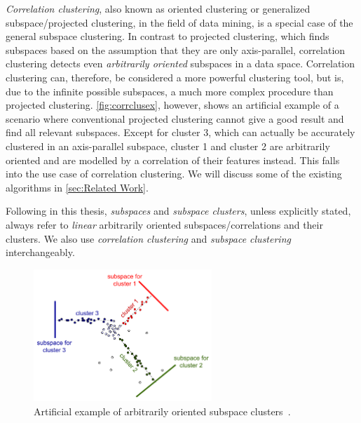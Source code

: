 \textit{Correlation clustering}, also known as oriented clustering or generalized subspace/projected clustering, in the field of data mining, is a special case of the general subspace clustering. In contrast to projected clustering, which finds subspaces based on the assumption that they are only axis-parallel, correlation clustering detects even \textit{arbitrarily oriented} subspaces in a data space. Correlation clustering can, therefore, be considered a more powerful clustering tool, but is, due to the infinite possible subspaces, a much more complex procedure than projected clustering. \autoref{fig:corrclusex}, however, shows an artificial example of a scenario where conventional projected clustering cannot give a good result and find all relevant subspaces. Except for cluster 3, which can actually be accurately clustered in an axis-parallel subspace, cluster 1 and cluster 2 are arbitrarily oriented and are modelled by a correlation of their features instead. This falls into the use case of correlation clustering. We will discuss some of the existing algorithms in \autoref{sec:Related Work}.


Following in this thesis, \textit{subspaces} and \textit{subspace clusters}, unless explicitly stated, always refer to \textit{linear} arbitrarily oriented subspaces/correlations and their clusters. We also use \textit{correlation clustering} and \textit{subspace clustering} interchangeably.
\begin{figure}
    \centering
    \includegraphics[width=0.6\textwidth]{figures/subcluex.png}
    \caption{Artificial example of arbitrarily oriented subspace clusters~\cite[Ch.3]{zimek2009correlation}.}
    \label{fig:corrclusex}
\end{figure}